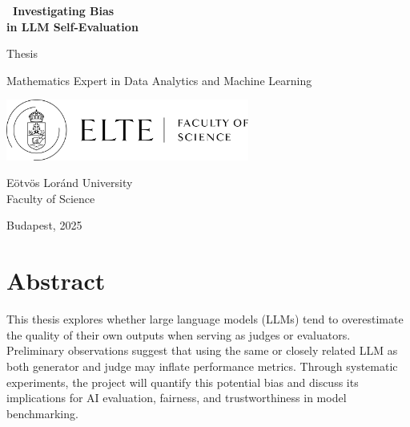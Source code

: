 \documentclass[noindent,nohyp,parspace,titlepage,twoside,12pt]{article}
\title{\TITLE}
\author{\AUTHOR}
\def\TITLE{\
  Investigating Bias \\
  in LLM Self-Evaluation\
}
\begin{document}
\begin{titlepage}

  \begin{center}
    \Huge\textbf{\TITLE}\normalsize
  \end{center}
  \begin{center}
    \Large Thesis \normalsize
  \end{center}

  \vfill


  \vfill

  \begin{center}
    \Large Mathematics Expert in Data Analytics and Machine Learning
    \normalsize
  \end{center}

  \begin{center}
    \includegraphics[width=0.6\textwidth]{img/logo} \\
  \end{center}

  \begin{center}
    \Large Eötvös Loránd University \\
    \Large Faculty of Science \normalsize
  \end{center}

  \begin{center}
    \Large Budapest, 2025 \normalsize
  \end{center}

\end{titlepage}

  \tableofcontents

\clearpage

  \section*{Abstract}

    This thesis explores whether large language models (LLMs) tend to
    overestimate the quality of their own outputs when serving as judges or
    evaluators. Preliminary observations suggest that using the same or
    closely related LLM as both generator and judge may inflate performance
    metrics. Through systematic experiments, the project will quantify this
    potential bias and discuss its implications for AI evaluation, fairness,
    and trustworthiness in model benchmarking.
\end{document}
